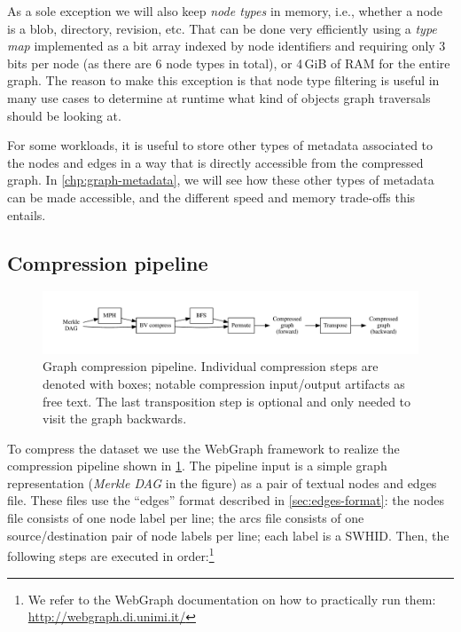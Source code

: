 As a sole exception we will also keep \emph{node types} in memory, i.e., whether
a node is a blob, directory, revision, etc. That can be done very
efficiently using a \emph{type map} implemented as a bit array indexed by
node identifiers and requiring only 3 bits per node (as there are 6 node
types in total), or 4\,GiB of RAM for the entire graph. The reason to make this
exception is that node type filtering is useful in many use cases to determine
at runtime what kind of objects graph traversals should be looking at.

For some workloads, it is useful to store other types of metadata associated to
the nodes and edges in a way that is directly accessible from the compressed
graph.
In \cref{chp:graph-metadata}, we will see how these other types of metadata can
be made accessible, and the different speed and memory trade-offs this entails.

\subsection{Compression pipeline}%
\label{sec:compression-pipeline}

\begin{figure}
  \centering
  \includegraphics[width=\linewidth,trim=1cm 1cm 1cm 1cm]{img/compression/compression_steps-nofiles}
  \caption{Graph compression pipeline. Individual compression steps are denoted
    with boxes; notable compression input/output artifacts as free text. The
    last transposition step is optional and only needed to visit the graph
    backwards.}%
  \label{fig:compression-pipeline}
\end{figure}

To compress the dataset we use the WebGraph framework to realize the
compression pipeline shown in \cref{fig:compression-pipeline}. The
pipeline input is a simple graph representation (\emph{Merkle DAG} in the
figure) as a pair of textual nodes and edges file. These files use the
``edges'' format described in \cref{sec:edges-format}: the nodes file
consists of one node label per line; the arcs file consists of one
source/destination pair of node labels per line; each label is a \gls{SWHID}.
Then, the following steps are executed in order:\footnote{We refer to the
WebGraph documentation on how to practically run them:
\url{http://webgraph.di.unimi.it/}}

